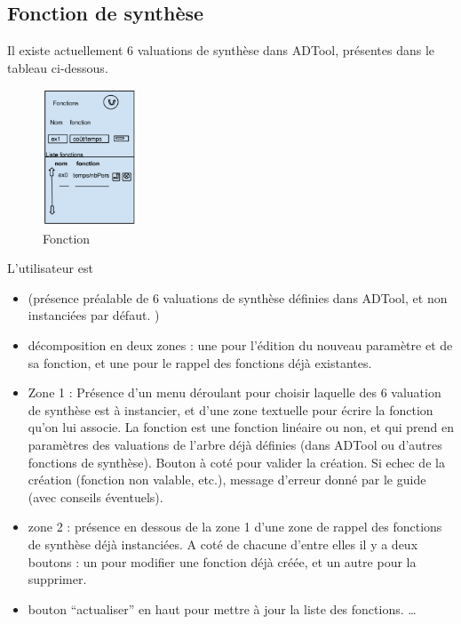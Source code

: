 	\subsection{Fonction de synthèse}
Il existe actuellement 6 valuations de synthèse dans ADTool, présentes dans le tableau ci-dessous.
		\begin{figure}
			\begin{center}
				\includegraphics[width=0.25\textwidth]{figure/fonction.png}
			\end{center}
			\caption{Fonction}
			\label{fig:fonction}
		\end{figure}

L'utilisateur est 
		\begin{itemize}
			\item (présence préalable de 6 valuations de synthèse définies dans ADTool, et non instanciées par défaut. )
			\item décomposition en deux zones : une pour l'édition du nouveau paramètre et de sa fonction, et une pour le rappel des fonctions déjà existantes.
			\item Zone 1 : Présence d’un menu déroulant pour choisir laquelle des 6 valuation de synthèse est à instancier, et d'une zone textuelle pour écrire la fonction qu'on lui associe. La fonction est une fonction linéaire ou non, et qui prend en paramètres des valuations de l'arbre déjà définies (dans ADTool ou d'autres fonctions de synthèse). Bouton à coté pour valider la création. Si echec de la création (fonction non valable, etc.), message d'erreur donné par le guide (avec conseils éventuels).
			\item zone 2 : présence en dessous de la zone 1 d’une zone de rappel des fonctions de synthèse déjà instanciées. A coté de chacune d’entre elles il y a deux boutons : un pour modifier une fonction déjà créée, et un autre pour la supprimer.
			\item bouton “actualiser” en haut pour mettre à jour la liste des fonctions. \ldots
		\end{itemize}
		
		
		


